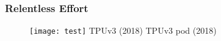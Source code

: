 \documentclass[c]{beamer}
\begin{document}
		\begin{frame} [c]
		\frametitle{Relentless Effort}
		\begin{figure}[t]
{\begin{minipage}[t]{65pt}
    \texttt{[image: test]}
    \newline
    \newline
    TPUv3\newline
{\small  (2018)}
\newline
\newline
\newline
\newline
\newline
TPUv3 pod\newline
{\small  (2018)}
\newline
\newline
\newline
\newline


\end{minipage}}
\end{figure}
\end{frame}
\end{document}
